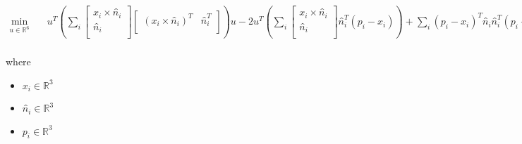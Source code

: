 \documentclass[12pt]{article}
\begin{document}
\[
\begin{aligned} \min_{\textit{u} \in \mathbb{R}^{ 6}} \quad & \textit{u}^T(\sum_\textit{i} \begin{bmatrix}
\textit{x}_{ \textit{i} } × \textit{n̂}_{ \textit{i} }\\
\textit{n̂}_{ \textit{i} }\\
\end{bmatrix}\begin{bmatrix}
(\textit{x}_{ \textit{i} } × \textit{n̂}_{ \textit{i} })^T & \textit{n̂}_{ \textit{i} }^T\\
\end{bmatrix})\textit{u} - 2\textit{u}^T(\sum_\textit{i} \begin{bmatrix}
\textit{x}_{ \textit{i} } × \textit{n̂}_{ \textit{i} }\\
\textit{n̂}_{ \textit{i} }\\
\end{bmatrix}\textit{n̂}_{ \textit{i} }^T(\textit{p}_{ \textit{i} } - \textit{x}_{ \textit{i} })) + \sum_\textit{i} (\textit{p}_{ \textit{i} } - \textit{x}_{ \textit{i} })^T\textit{n̂}_{ \textit{i} }\textit{n̂}_{ \textit{i} }^T(\textit{p}_{ \textit{i} } - \textit{x}_{ \textit{i} }) \\
\end{aligned}
\]

where
\begin{itemize}
\item $\textit{x}_{\textit{i}} \in \mathbb{R}^{ 3}$
\item $\textit{n̂}_{\textit{i}} \in \mathbb{R}^{ 3}$
\item $\textit{p}_{\textit{i}} \in \mathbb{R}^{ 3}$
\end{itemize}
\end{document}
